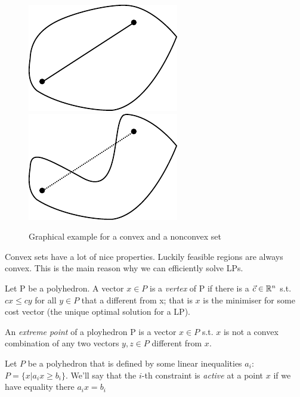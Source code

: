 \begin{figure}[hbt]
\begin{center}
\includegraphics{./images/convex.pdf}\hspace{2cm}
\includegraphics{./images/notConvex.pdf}
\end{center}
\caption{Graphical example for a convex and a nonconvex set}
\label{Fig:convexNotConvex}
\end{figure}

Convex sets have a lot of nice properties. Luckily feasible regions are always convex. This is the main reason why we can efficiently solve LPs.

\begin{Def}[Vertex]\label{Def:Vertex} Let P be a polyhedron. A vector $x\in P$ is a \emph{vertex} of P if there is a $\vec c\in \mathbb{R}^n$
 s.t. $cx\leq cy$ for all $y\in P$ that a different from x; that is $x$ is the minimiser for some cost vector (the unique optimal solution for a LP).
\end{Def}

\begin{Def}\label{Def:ExtremePoint} An \emph{extreme point} of a ployhedron P is a vector $x\in P$ s.t. $x$ is not a convex combination of any two vectors $y,z\in P$ different from $x$.
\end{Def}

\begin{Def} Let $P$ be a polyhedron that is defined by some linear inequalities $a_i$: $P=\{x|a_ix\geq b_i\}$. We'll say that the $i$-th constraint is \emph{active} at a point $x$ if we have equality there $a_ix = b_i$
\end{Def}


